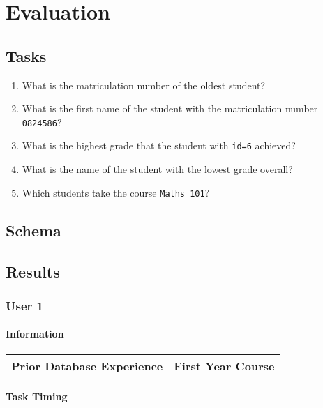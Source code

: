 \chapter{Evaluation}

\section{Tasks}
\label{sec:tasks}

\begin{enumerate}
\item What is the matriculation number of the oldest student?
\item What is the first name of the student with the matriculation number \texttt{0824586}?
\item What is the highest grade that the student with \texttt{id=6} achieved?
\item What is the name of the student with the lowest grade overall?
\item Which students take the course \texttt{Maths 101}?
\end{enumerate}

\section{Schema}
\label{sec:schema}


\section{Results}

\subsection{User 1}

\subsubsection{Information}

\begin{tabular}{|l|l|}
	\hline
	\textbf{Prior Database Experience} & First Year Course \\
	\hline
\end{tabular}

\subsubsection{Task Timing}

